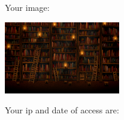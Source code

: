 \documentclass{article}
\begin{document}
Your image:
\begin{center}
\includegraphics[width=5cm]{source.jpg}
\end{center}
Your ip and date of access are:
\end{document}
